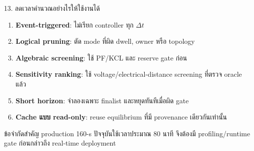\documentclass[aspectratio=169,12pt]{beamer}
\begin{document}
\begin{frame}{13. ลดเวลาคำนวณอย่างไรให้ใช้งานได้}
\begin{enumerate}
  \item \textbf{Event-triggered}: ไม่เรียก controller ทุก $\Delta t$
  \item \textbf{Logical pruning}: ตัด mode ที่ผิด dwell, owner หรือ topology
  \item \textbf{Algebraic screening}: ใช้ PF/KCL และ reserve gate ก่อน
  \item \textbf{Sensitivity ranking}: ใช้ voltage/electrical-distance screening ที่ตรวจ oracle แล้ว
  \item \textbf{Short horizon}: จำลองเฉพาะ finalist และหยุดทันทีเมื่อผิด gate
  \item \textbf{Cache แบบ read-only}: reuse equilibrium ที่มี provenance เดียวกันเท่านั้น
\end{enumerate}
\begin{alertblock}{ข้อจำกัดสำคัญ}
production 160-s ปัจจุบันใช้เวลาประมาณ 80 นาที จึงต้องมี profiling/runtime gate ก่อนกล่าวถึง real-time deployment
\end{alertblock}
\end{frame}
\end{document}
